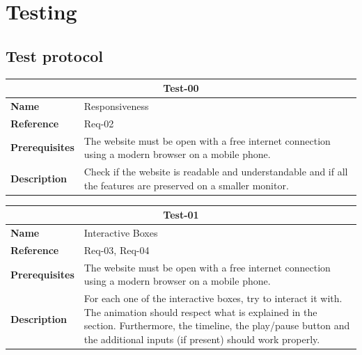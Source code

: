 \documentclass{article}
\begin{document}
\section{Testing}

\subsection{Test protocol}

\bgroup{}
\def\arraystretch{1.25}
\begin{center}
    \begin{tabular}{ |l|p{9cm}| }
        \hline
        \multicolumn{2}{|c|}{\textbf{Test-00}} \\
        \hline
        \textbf{Name} & Responsiveness \\
        \hline
        \textbf{Reference} & Req-02 \\
        \hline
        \textbf{Prerequisites} & The website must be open with a free internet connection using a modern browser on a mobile phone. \\
        \hline
        \textbf{Description} & Check if the website is readable and understandable and if all the features are preserved on a smaller monitor. \\
        \hline
    \end{tabular}
\end{center}
\egroup{}

\bgroup{}
\def\arraystretch{1.25}
\begin{center}
    \begin{tabular}{ |l|p{9cm}| }
        \hline
        \multicolumn{2}{|c|}{\textbf{Test-01}} \\
        \hline
        \textbf{Name} & Interactive Boxes \\
        \hline
        \textbf{Reference} & Req-03, Req-04 \\
        \hline
        \textbf{Prerequisites}
        & The website must be open with a free internet connection
        using a modern browser on a mobile phone. \\
        \hline
        \textbf{Description}
        & For each one of the interactive boxes,
        try to interact it with.
        The animation should respect what is explained in the section.
        Furthermore, the timeline, the play/pause button and the
        additional inputs (if present) should work properly. \\
        \hline
    \end{tabular}
\end{center}
\egroup{}
\end{document}
